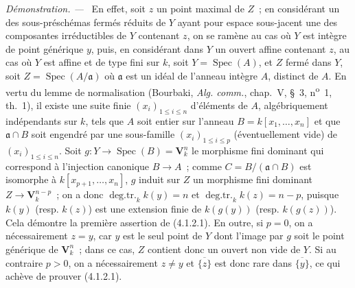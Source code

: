\documentclass[10pt,oneside]{book}
\newenvironment{proof}{%
  \par\medskip\noindent\textit{Démonstration. ---\ }}{\par}
\begin{document}
\begin{proof}
En effet, soit $z$ un point maximal de $Z$~; en considérant un des
sous-préschémas fermés réduits de $Y$ ayant pour espace sous-jacent une des
composantes irréductibles de $Y$ contenant $z$, on se ramène au cas où $Y$ est
intègre de point générique $y$, puis, en considérant dans $Y$ un ouvert affine
contenant $z$, au cas où $Y$ est affine et de type fini sur $k$, soit
$Y=\operatorname{Spec}(A)$, et $Z$ fermé dans $Y$, soit
$Z=\operatorname{Spec}(A/\mathfrak a)$ où $\mathfrak a$ est un idéal de
l'anneau intègre $A$, distinct de $A$. En vertu du lemme de normalisation
(Bourbaki, \emph{Alg. comm.}, chap.~V, \S~3,
n\textsuperscript{o}~1, th.~1), il existe une suite finie
$(x_i)_{1\leqslant i\leqslant n}$ d'éléments de $A$, algébriquement
indépendants sur $k$, tels que $A$ soit entier sur l'anneau
$B=k[x_1,\ldots,x_n]$ et que $\mathfrak a\cap B$ soit engendré par une
sous-famille $(x_i)_{1\leqslant i\leqslant p}$ (éventuellement vide) de
$(x_i)_{1\leqslant i\leqslant n}$. Soit
$g:Y\to\operatorname{Spec}(B)=\mathbf V_k^n$ le morphisme fini dominant qui
correspond à l'injection canonique $B\to A$~; comme
$C=B/(\mathfrak a\cap B)$ est isomorphe à $k[x_{p+1},\ldots,x_n]$, $g$ induit
sur $Z$ un morphisme fini dominant $Z\to\mathbf V_k^{n-p}$~; on a donc
$\operatorname{deg.tr.}_k k(y)=n$ et
$\operatorname{deg.tr.}_k k(z)=n-p$, puisque $k(y)$ (resp. $k(z)$) est une
extension finie de $k(g(y))$ (resp. $k(g(z))$). Cela démontre la première
assertion de (4.1.2.1). En outre, si $p=0$, on a nécessairement $z=y$, car $y$
est le seul point de $Y$ dont l'image par $g$ soit le point générique de
$\mathbf V_k^n$~; dans ce cas, $Z$ contient donc un ouvert non vide de $Y$. Si
au contraire $p>0$, on a nécessairement $z\neq y$ et
$\overline{\{z\}}$ est donc rare dans $\overline{\{y\}}$, ce qui achève de
prouver (4.1.2.1).
\end{proof}
\end{document}
